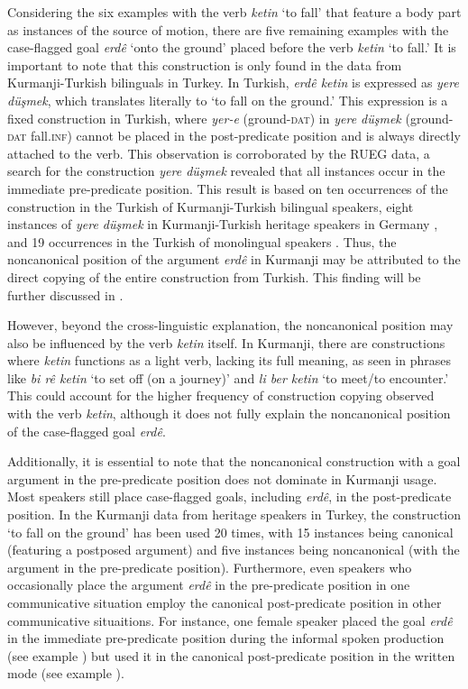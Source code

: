 Considering the six examples with the verb \textit{ketin} ‘to fall’ that feature a body part as instances of the source of motion, there are five remaining examples with the case-flagged goal \textit{erdê} ‘onto the ground’ placed before the verb \textit{ketin} ‘to fall.’ It is important to note that this construction is only found in the data from Kurmanji-Turkish bilinguals in Turkey. In Turkish, \textit{erdê ketin} is expressed as \textit{yere düşmek}, which translates literally to ‘to fall on the ground.’ This expression is a fixed construction in Turkish, where \textit{yer-e} (ground-\textsc{dat}) in \textit{yere düşmek} (ground-\textsc{dat} fall.\textsc{inf}) cannot be placed in the post-predicate position and is always directly attached to the verb. This observation is corroborated by the RUEG data, a search for the construction \textit{yere düşmek} revealed that all instances occur in the immediate pre-predicate position. This result is based on ten occurrences of the construction in the Turkish of Kurmanji-Turkish bilingual speakers, eight instances of \textit{yere düşmek} in Kurmanji-Turkish heritage speakers in Germany \citep{IefremenkoEtAl2024}, and 19 occurrences in the Turkish of monolingual speakers \citep{LudelingEtAl2024}. Thus, the noncanonical position of the argument \textit{erdê} in Kurmanji may be attributed to the direct copying of the entire construction from Turkish. This finding will be further discussed in .

However, beyond the cross-linguistic explanation, the noncanonical position may also be influenced by the verb \textit{ketin} itself. In Kurmanji, there are constructions where \textit{ketin} functions as a light verb, lacking its full meaning, as seen in phrases like \textit{bi rê ketin} ‘to set off (on a journey)’ and \textit{li ber ketin} ‘to meet/to encounter.’ This could account for the higher frequency of construction copying observed with the verb \textit{ketin}, although it does not fully explain the noncanonical position of the case-flagged goal \textit{erdê}.

Additionally, it is essential to note that the noncanonical construction with a goal argument in the pre-predicate position does not dominate in Kurmanji usage. Most speakers still place case-flagged goals, including \textit{erdê}, in the post-predicate position. In the Kurmanji data from heritage speakers in Turkey, the construction ‘to fall on the ground’ has been used 20 times, with 15 instances being canonical (featuring a postposed argument) and five instances being noncanonical (with the argument in the pre-predicate position). Furthermore, even speakers who occasionally place the argument \textit{erdê} in the pre-predicate position in one communicative situation employ the canonical post-predicate position in other communicative situaitions. For instance, one female speaker placed the goal \textit{erdê} in the immediate pre-predicate position during the informal spoken production (see example ) but used it in the canonical post-predicate position in the written mode (see example ).

